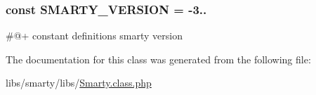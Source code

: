 \subsubsection[{S\+M\+A\+R\+T\+Y\+\_\+\+V\+E\+R\+S\+I\+O\+N}]{\setlength{\rightskip}{0pt plus 5cm}const S\+M\+A\+R\+T\+Y\+\_\+\+V\+E\+R\+S\+I\+O\+N = -\/3..\textquotesingle{}}\label{class_smarty_a38a3b7b2e496b24a1bf2976ac1552ed7}
\#@+ constant definitions smarty version 

The documentation for this class was generated from the following file\+:\begin{DoxyCompactItemize}
\item 
libs/smarty/libs/\hyperlink{_smarty_8class_8php}{Smarty.\+class.\+php}\end{DoxyCompactItemize}
